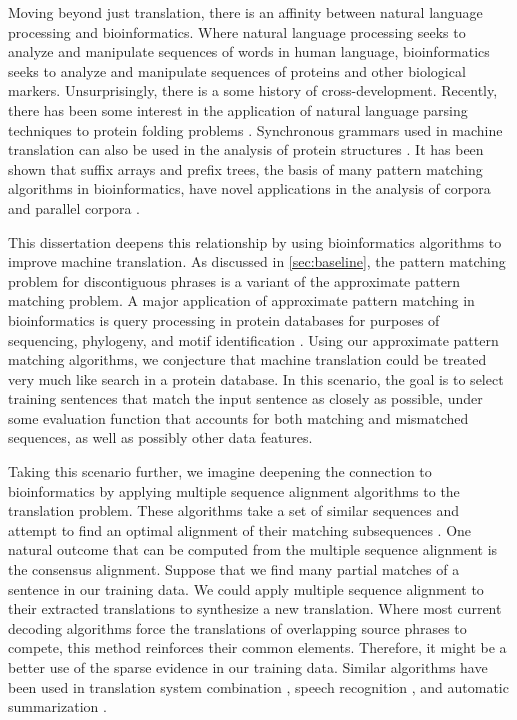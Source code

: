 Moving beyond just translation, there
is an affinity between natural language processing and bioinformatics.  
Where natural language processing seeks to analyze and
manipulate sequences of words in human language, bioinformatics seeks
to analyze and manipulate sequences of proteins and other biological markers.
Unsurprisingly, there is a some history of cross-development.  Recently,
there has been some interest in the application of natural language
parsing techniques to protein folding problems 
\citep{Hockenmaier:2006:emnlp}.
Synchronous grammars used in machine translation can also be 
used in the analysis of protein structures
\citep{Chiang:2004:thesis}.
It has been shown that suffix arrays and prefix trees, the basis
of many pattern matching algorithms in 
bioinformatics, have novel applications in the analysis of corpora
\citep{Yamamoto:2001:cl} and parallel corpora \citep{McNamee:2006:amta}.  

This dissertation deepens this relationship by using 
bioinformatics algorithms to improve machine translation.  
As discussed in \textsection\ref{sec:baseline}, the pattern
matching problem for discontiguous phrases is a variant
of the approximate pattern matching problem.  A major
application of approximate pattern matching in bioinformatics
is query processing in protein databases for purposes of 
sequencing, phylogeny, and motif identification \citep{Gusfield:1997:book}.  
Using our approximate pattern matching algorithms, we
conjecture that machine translation could be treated very
much like search in a protein database.  In this scenario,
the goal is to select training sentences that
match the input sentence as closely as possible, under
some evaluation function that accounts for both matching 
and mismatched sequences, as well as possibly
other data features.  

Taking this scenario further, we imagine deepening the 
connection to bioinformatics by applying multiple sequence
alignment algorithms to the translation problem.  These
algorithms take a set of similar sequences
and attempt to find an optimal alignment of their matching
subsequences \citep{Durbin:1998:book}.  One natural outcome that can be computed
from the multiple sequence alignment is the consensus alignment.
Suppose that we find many partial matches of a sentence
in our training data.  We could apply multiple sequence alignment
to their extracted translations to synthesize a new translation.
Where most current decoding algorithms force the translations
of overlapping source phrases to compete, this method
reinforces their common elements.  Therefore, it might
be a better use of the sparse evidence in our training
data.  Similar algorithms have been used in 
translation system combination \citep{rosti:2007:hlt-naacl},
speech recognition \citep{Mangu:2000:csl}, and automatic
summarization \citep{Barzilay:2003:hlt-naacl}.

